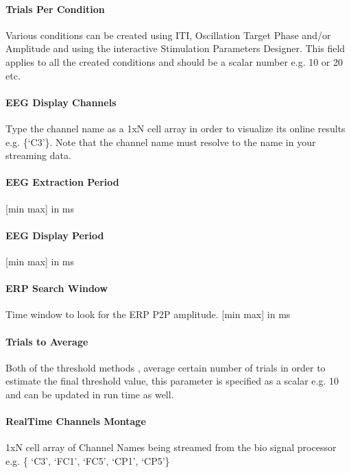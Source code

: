 \documentclass[letterpaper,10pt,english]{sphinxmanual}
\begin{document}
\paragraph{Trials Per Condition}
\label{\detokenize{14_ERPMeasurement:trials-per-condition}}
\sphinxAtStartPar
Various conditions can be created using ITI, Oscillation Target Phase and/or Amplitude and using the interactive Stimulation Parameters Designer. This field applies to all the created conditions and should be a scalar number e.g. 10 or 20 etc.


\paragraph{EEG Display Channels}
\label{\detokenize{14_ERPMeasurement:eeg-display-channels}}
\sphinxAtStartPar
Type the channel name as a 1xN cell array in order to visualize its online results e.g. \{‘C3’\}. Note that the channel name must resolve to the name in your streaming data.


\paragraph{EEG Extraction Period}
\label{\detokenize{14_ERPMeasurement:eeg-extraction-period}}
\sphinxAtStartPar
{[}min max{]} in ms


\paragraph{EEG Display Period}
\label{\detokenize{14_ERPMeasurement:eeg-display-period}}
\sphinxAtStartPar
{[}min max{]} in ms


\paragraph{ERP Search Window}
\label{\detokenize{14_ERPMeasurement:erp-search-window}}
\sphinxAtStartPar
Time window to look for the ERP P2P amplitude. {[}min max{]} in ms


\paragraph{Trials to Average}
\label{\detokenize{14_ERPMeasurement:trials-to-average}}
\sphinxAtStartPar
Both of the threshold methods , average certain number of trials in order to estimate the final threshold value, this parameter is specified as a scalar e.g. 10 and can be updated in run time as well.


\paragraph{Real\sphinxhyphen{}Time Channels Montage}
\label{\detokenize{14_ERPMeasurement:real-time-channels-montage}}
\sphinxAtStartPar
1xN cell array of Channel Names being streamed from the bio signal processor e.g. \{ ‘C3’, ‘FC1’, ‘FC5’, ‘CP1’, ‘CP5’\}
\end{document}
